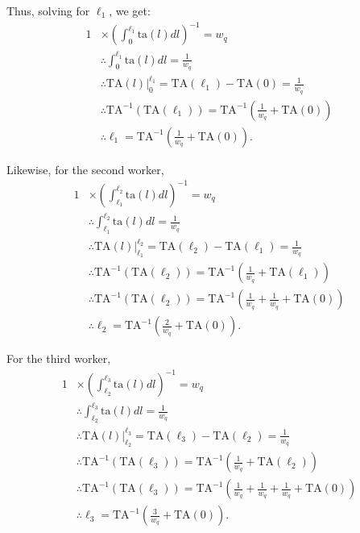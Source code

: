 \documentclass[hidelinks, nonatbib]{elsarticle}
\begin{document}
Thus, solving for $\ell_1$, we get:
\begin{align}
1 
&\times 
\left(
    \int_{0}^{\ell_1}
    \text{ta}(l)
    dl
\right) ^ {-1}
=
w_q
\\
&\therefore
\int_{0}^{\ell_1}
\text{ta}(l)
dl
=
\frac{1}{w_q}
\\
&\therefore
\text{TA}(l)
\big|_{0}^{\ell_1}
=
\text{TA}(\ell_1)
-
\text{TA}(0)
=
\frac{1}{w_q}
\\
&\therefore
\text{TA}^{-1}(
    \text{TA}(\ell_1)
)
=
\text{TA}^{-1}\left(
    \frac{1}{w_q}
    +
    \text{TA}(0)
\right)
\\
&\therefore
\ell_1
=
\text{TA}^{-1}\left(
    \frac{1}{w_q}
    +
    \text{TA}(0)
\right)
.
\end{align}

Likewise, for the second worker,
\begin{align}
1 
&\times 
\left(
    \int_{\ell_1}^{\ell_2}
    \text{ta}(l)
    dl
\right) ^ {-1}
=
w_q
\\
&\therefore
\int_{\ell_1}^{\ell_2}
\text{ta}(l)
dl
=
\frac{1}{w_q}
\\
&\therefore
\text{TA}(l)
\big|_{\ell_1}^{\ell_2}
=
\text{TA}(\ell_2)
-
\text{TA}(\ell_1)
=
\frac{1}{w_q}
\\
&\therefore
\text{TA}^{-1}(
    \text{TA}(\ell_2)
)
=
\text{TA}^{-1}\left(
    \frac{1}{w_q}
    +
    \text{TA}(\ell_1)
\right)
\\
&\therefore
\text{TA}^{-1}(
    \text{TA}(\ell_2)
)
=
\text{TA}^{-1}\left(
    \frac{1}{w_q}
    +
    \frac{1}{w_q}
    +
    \text{TA}(0)
\right)
\\
&\therefore
\ell_2
=
\text{TA}^{-1}\left(
    \frac{2}{w_q}
    +
    \text{TA}(0)
\right)
.
\end{align}

For the third worker,
\begin{align}
1 
&\times 
\left(
    \int_{\ell_2}^{\ell_3}
    \text{ta}(l)
    dl
\right) ^ {-1}
=
w_q
\\
&\therefore
\int_{\ell_2}^{\ell_3}
\text{ta}(l)
dl
=
\frac{1}{w_q}
\\
&\therefore
\text{TA}(l)
\big|_{\ell_2}^{\ell_3}
=
\text{TA}(\ell_3)
-
\text{TA}(\ell_2)
=
\frac{1}{w_q}
\\
&\therefore
\text{TA}^{-1}(
    \text{TA}(\ell_3)
)
=
\text{TA}^{-1}\left(
    \frac{1}{w_q}
    +
    \text{TA}(\ell_2)
\right)
\\
&\therefore
\text{TA}^{-1}(
    \text{TA}(\ell_3)
)
=
\text{TA}^{-1}\left(
    \frac{1}{w_q}
    +
    \frac{1}{w_q}
    +
    \frac{1}{w_q}
    +
    \text{TA}(0)
\right)
\\
&\therefore
\ell_3
=
\text{TA}^{-1}\left(
    \frac{3}{w_q}
    +
    \text{TA}(0)
\right)
.
\end{align}
\end{document}
